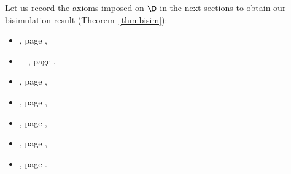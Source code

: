 \documentclass{LMCS}
\theoremstyle{plain}\newtheorem{satz}[thm]{Satz}
\begin{document}
Let us record the axioms imposed on $\D$ in the next sections to
obtain our bisimulation result (Theorem~\ref{thm:bisim}):
\begin{center}
  \begin{minipage}[t]{0.48\linewidth}
    \begin{itemize}
    \item {}, page \pageref{fibration},
    \item {}---, page
      \pageref{discreteness},
    \item {}, page \pageref{ax:views},
    \item {}, page \pageref{leftdecomposition},
    \end{itemize}
  \end{minipage}
  \hfil
  \begin{minipage}[t]{0.48\linewidth}
    \begin{itemize}
    \item {}, page \pageref{views:decomp},
    \item {}, page \pageref{finiteness},
    \item {}, page \pageref{basic:full}.
    \end{itemize}
  \end{minipage}
\end{center}
\end{document}
